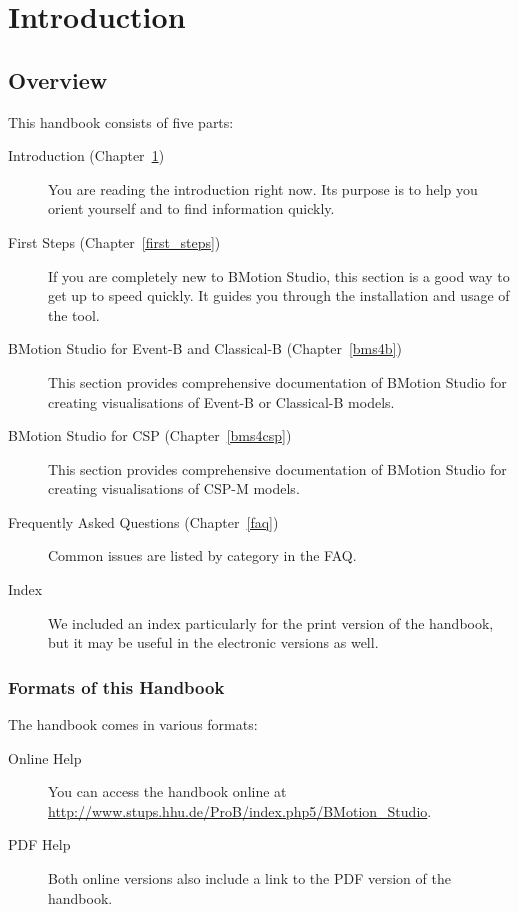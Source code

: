 \documentclass[twoside,10pt]{book}
\begin{document}
\chapter{Introduction}
\label{introduction}

\section{Overview}

This handbook consists of five parts:

\begin{description}
	\item[Introduction (Chapter~\ref{introduction})] You are reading the introduction right now.  Its purpose is to help you orient yourself and to find information quickly.
	\item[First Steps (Chapter~\ref{first_steps})] If you are completely new to BMotion Studio, this section is a good way to get up to speed quickly. 
	It guides you through the installation and usage of the tool.
	\item[BMotion Studio for Event-B and Classical-B (Chapter~\ref{bms4b})] This section provides comprehensive documentation of BMotion Studio for creating visualisations of Event-B or Classical-B models.
	\item[BMotion Studio for CSP (Chapter~\ref{bms4csp})] This section provides comprehensive documentation of BMotion Studio for creating visualisations of CSP-M models.	
	\item[Frequently Asked Questions  (Chapter~\ref{faq})] Common issues are listed by category in the FAQ.
	\item[Index] We included an index particularly for the print version of the handbook, but it may be useful in the electronic versions as well.  
\end{description}

\subsection{Formats of this Handbook}
\label{handbook_formats}

The handbook comes in various formats:

\begin{description}
	\item[Online Help] You can access the handbook online at \url{http://www.stups.hhu.de/ProB/index.php5/BMotion_Studio}.
	\item[PDF Help] Both online versions also include a link to the PDF version of the handbook.
\end{description}
\end{document}
